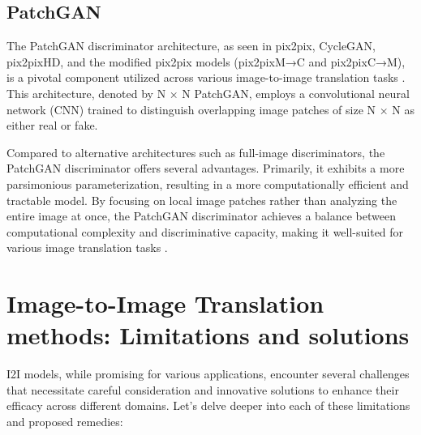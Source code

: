 \documentclass[UKenglish,12pt]{master-style}
\begin{document}
\subsection{PatchGAN}

The PatchGAN discriminator architecture, as seen in pix2pix, CycleGAN, pix2pixHD, and the modified pix2pix models (pix2pixM→C and pix2pixC→M), is a pivotal component utilized across various image-to-image translation tasks \cite{patch_gan}. This architecture, denoted by N × N PatchGAN, employs a convolutional neural network (CNN) trained to distinguish overlapping image patches of size N × N as either real or fake.

Compared to alternative architectures such as full-image discriminators, the PatchGAN discriminator offers several advantages. Primarily, it exhibits a more parsimonious parameterization, resulting in a more computationally efficient and tractable model. By focusing on local image patches rather than analyzing the entire image at once, the PatchGAN discriminator achieves a balance between computational complexity and discriminative capacity, making it well-suited for various image translation tasks \cite{patch_gan}.

\section{Image-to-Image Translation methods: Limitations and solutions}

I2I models, while promising for various applications, encounter several challenges that necessitate careful consideration and innovative solutions to enhance their efficacy across different domains. Let's delve deeper into each of these limitations and proposed remedies:
\end{document}

